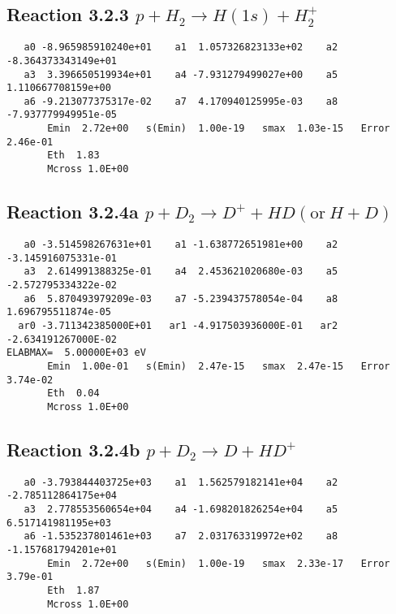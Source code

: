 \documentclass[12pt,dvipdfmx]{article}
\begin{document}
\newpage
\subsection{
Reaction 3.2.3 $   p + H_2 \rightarrow H(1s) + H_2^+$}


\begin{small}\begin{verbatim}
   a0 -8.965985910240e+01    a1  1.057326823133e+02    a2 -8.364373343149e+01
   a3  3.396650519934e+01    a4 -7.931279499027e+00    a5  1.110667708159e+00
   a6 -9.213077375317e-02    a7  4.170940125995e-03    a8 -7.937779949951e-05
       Emin  2.72e+00   s(Emin)  1.00e-19   smax  1.03e-15   Error  2.46e-01
       Eth  1.83
       Mcross 1.0E+00
\end{verbatim}\end{small}

\newpage
\subsection{
Reaction 3.2.4a $   p + D_2 \rightarrow D^+ + HD (\mbox{or}~ H + D)$}


\begin{small}\begin{verbatim}
   a0 -3.514598267631e+01    a1 -1.638772651981e+00    a2 -3.145916075331e-01
   a3  2.614991388325e-01    a4  2.453621020680e-03    a5 -2.572795334322e-02
   a6  5.870493979209e-03    a7 -5.239437578054e-04    a8  1.696795511874e-05
  ar0 -3.711342385000E+01   ar1 -4.917503936000E-01   ar2 -2.634191267000E-02
ELABMAX=  5.00000E+03 eV
       Emin  1.00e-01   s(Emin)  2.47e-15   smax  2.47e-15   Error  3.74e-02
       Eth  0.04
       Mcross 1.0E+00
\end{verbatim}\end{small}

\newpage
\subsection{
Reaction 3.2.4b $   p + D_2 \rightarrow D + HD^+$}


\begin{small}\begin{verbatim}
   a0 -3.793844403725e+03    a1  1.562579182141e+04    a2 -2.785112864175e+04
   a3  2.778553560654e+04    a4 -1.698201826254e+04    a5  6.517141981195e+03
   a6 -1.535237801461e+03    a7  2.031763319972e+02    a8 -1.157681794201e+01
       Emin  2.72e+00   s(Emin)  1.00e-19   smax  2.33e-17   Error  3.79e-01
       Eth  1.87
       Mcross 1.0E+00
\end{verbatim}\end{small}
\end{document}
